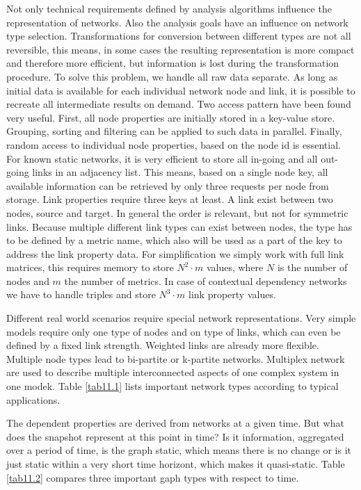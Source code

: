 \documentclass[a4paper,10pt]{scrbook}
\begin{document}
Not only technical requirements defined by analysis algorithms influence the representation of networks. Also the analysis goals have an influence on network type selection. Transformations for conversion between different types are not all reversible, this means, in some cases the resulting representation is more compact and therefore more efficient, but information is lost during the transformation procedure. To solve this problem, we handle all raw data separate. As long as initial data is available for each individual network node and link, it is possible to recreate all intermediate results on demand. Two access pattern have been found very useful. First, all node properties are initially stored in a key-value store. Grouping, sorting and filtering can be applied to such data in parallel. Finally, random access to individual node properties, based on the node id is essential. For known static networks, it is very efficient to store all in-going and all out-going links in an adjacency list. This means, based on a single node key, all available information can be retrieved by only three requests per node from storage. Link properties require three keys at least. A link exist between two nodes, source and target. In general the order is relevant, but not for symmetric links. Because multiple different link types can exist between nodes, the type has to be defined by a metric name, which also will be used as a part of the key to address the link property data. For simplification we simply work with full link matrices, this requires memory to store $N^2 \cdot m$ values, where $N$ is the number of nodes and $m$ the number of metrics. In case of contextual dependency networks we have to handle triples and store $N^3 \cdot m$ link property values.  

Different real world scenarios require special network representations. Very simple models require only one type of nodes and on type of links, which can even be defined by a fixed link strength. Weighted links are already more flexible. Multiple node types lead to bi-partite or k-partite networks. Multiplex network are used to describe multiple interconnected aspects of one complex system in one modek. Table \ref{tab11.1} lists important network types according to typical applications.

The dependent properties are derived from networks at a given time. But what does the snapshot represent at this point in time? Is it information, aggregated over a period of time, is the graph static, which means there is no change or is it just static within a very short time horizont, which makes it quasi-static. Table \ref{tab11.2} compares three important gaph types with respect to time.
\end{document}

